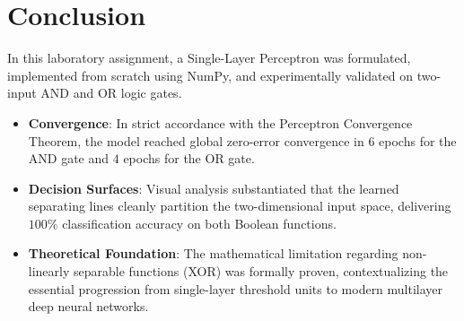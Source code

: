 \documentclass[12pt]{article}
\begin{document}
\section{Conclusion}
In this laboratory assignment, a Single-Layer Perceptron was formulated, implemented from scratch using NumPy, and experimentally validated on two-input AND and OR logic gates. 
\begin{itemize}
    \item \textbf{Convergence}: In strict accordance with the Perceptron Convergence Theorem, the model reached global zero-error convergence in $6$ epochs for the AND gate and $4$ epochs for the OR gate.
    \item \textbf{Decision Surfaces}: Visual analysis substantiated that the learned separating lines cleanly partition the two-dimensional input space, delivering $100\%$ classification accuracy on both Boolean functions.
    \item \textbf{Theoretical Foundation}: The mathematical limitation regarding non-linearly separable functions (XOR) was formally proven, contextualizing the essential progression from single-layer threshold units to modern multilayer deep neural networks.
\end{itemize}
\end{document}
